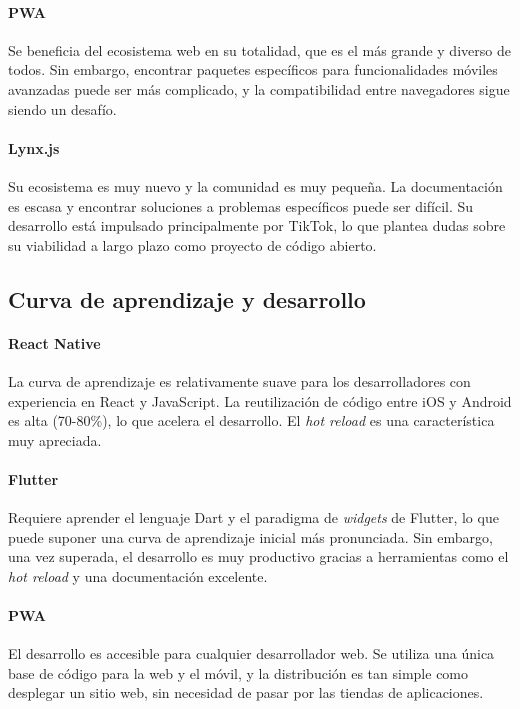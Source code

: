 \paragraph{PWA}
Se beneficia del ecosistema web en su totalidad, que es el más grande y diverso de todos. Sin embargo, encontrar paquetes específicos para funcionalidades móviles avanzadas puede ser más complicado, y la compatibilidad entre navegadores sigue siendo un desafío.

\paragraph{Lynx.js}
Su ecosistema es muy nuevo y la comunidad es muy pequeña. La documentación es escasa y encontrar soluciones a problemas específicos puede ser difícil. Su desarrollo está impulsado principalmente por TikTok, lo que plantea dudas sobre su viabilidad a largo plazo como proyecto de código abierto.

\subsection{Curva de aprendizaje y desarrollo}

\paragraph{React Native}
La curva de aprendizaje es relativamente suave para los desarrolladores con experiencia en React y JavaScript. La reutilización de código entre iOS y Android es alta (70-80\%), lo que acelera el desarrollo. El \textit{hot reload} es una característica muy apreciada.

\paragraph{Flutter}
Requiere aprender el lenguaje Dart y el paradigma de \textit{widgets} de Flutter, lo que puede suponer una curva de aprendizaje inicial más pronunciada. Sin embargo, una vez superada, el desarrollo es muy productivo gracias a herramientas como el \textit{hot reload} y una documentación excelente.

\paragraph{PWA}
El desarrollo es accesible para cualquier desarrollador web. Se utiliza una única base de código para la web y el móvil, y la distribución es tan simple como desplegar un sitio web, sin necesidad de pasar por las tiendas de aplicaciones.

